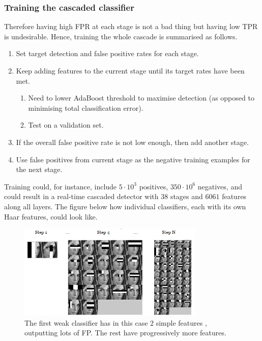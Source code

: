 \documentclass[a4paper]{article}
\begin{document}
\subsubsection{Training the cascaded classifier}
Therefore having high FPR at each stage is not a bad thing but having low TPR is undesirable. Hence, training the whole cascade is summarised as follows.
\begin{enumerate}
    \item Set target detection and false positive rates for each stage.
    \item Keep adding features to the current stage until its target rates have been met.
    \begin{enumerate}
        \item Need  to lower AdaBoost threshold  to maximise detection (as opposed  to minimising total classification  error).
        \item Test  on a validation set.
    \end{enumerate}
    \item If the overall false positive rate is not low enough, then add another stage.
    \item Use false positives from current stage as the negative training  examples for the next stage.
\end{enumerate}
Training could, for instance, include $5\cdot 10^3$ positives, $350\cdot 10^6$ negatives, and could result in a real-time cascaded detector with $38$ stages and $6061$ features along all layers. The figure below how individual classifiers, each with its own Haar features, could look like.

\begin{figure}[H]
    \centering
    \includegraphics[height=4.5cm]{img/cascade_vis.png}
    \caption{The first weak classifier has in this case 2 simple features , outputting lots of FP. The rest have progressively more features.}
\end{figure}
\end{document}
